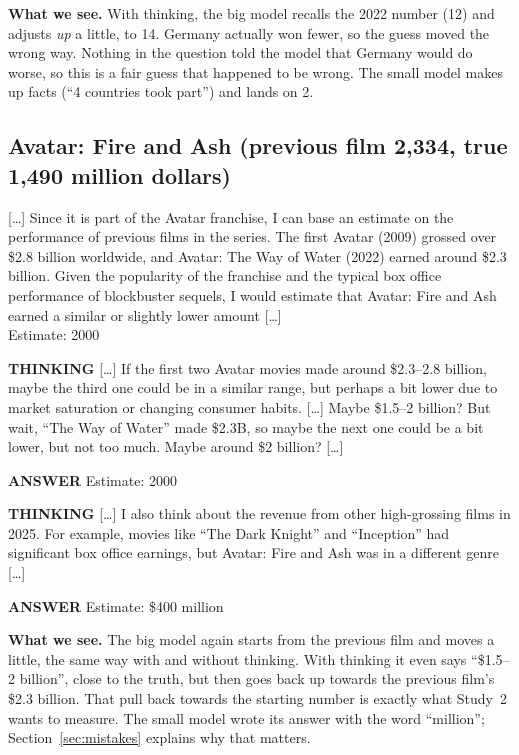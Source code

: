 \documentclass[11pt,a4paper]{article}
\newcommand{\who}[1]{\par\smallskip\noindent\textsf{\textbf{\footnotesize\MakeUppercase{#1}}}\quad}
\newcommand{\cut}{\textup{[\dots]}}
\begin{document}
\noindent\textbf{What we see.} With thinking, the big model recalls the 2022 number (12) and adjusts \emph{up} a little, to 14. Germany actually won fewer, so the guess moved the wrong way. Nothing in the question told the model that Germany would do worse, so this is a fair guess that happened to be wrong. The small model makes up facts (``4 countries took part'') and lands on 2.

\subsection{Avatar: Fire and Ash (previous film 2,334, true 1,490 million dollars)}

\begin{transcript}
\cut{} Since it is part of the Avatar franchise, I can base an estimate on the performance of previous films in the series. The first Avatar (2009) grossed over \$2.8 billion worldwide, and Avatar: The Way of Water (2022) earned around \$2.3 billion. Given the popularity of the franchise and the typical box office performance of blockbuster sequels, I would estimate that Avatar: Fire and Ash earned a similar or slightly lower amount \cut{}\\
Estimate: 2000
\end{transcript}

\begin{transcript}
\who{Thinking} \cut{} If the first two Avatar movies made around \$2.3--2.8 billion, maybe the third one could be in a similar range, but perhaps a bit lower due to market saturation or changing consumer habits. \cut{} Maybe \$1.5--2 billion? But wait, ``The Way of Water'' made \$2.3B, so maybe the next one could be a bit lower, but not too much. Maybe around \$2 billion? \cut{}
\who{Answer} Estimate: 2000
\end{transcript}

\begin{transcript}
\who{Thinking} \cut{} I also think about the revenue from other high-grossing films in 2025. For example, movies like ``The Dark Knight'' and ``Inception'' had significant box office earnings, but Avatar: Fire and Ash was in a different genre \cut{}
\who{Answer} Estimate: \$400 million
\end{transcript}

\noindent\textbf{What we see.} The big model again starts from the previous film and moves a little, the same way with and without thinking. With thinking it even says ``\$1.5--2 billion'', close to the truth, but then goes back up towards the previous film's \$2.3 billion. That pull back towards the starting number is exactly what Study~2 wants to measure. The small model wrote its answer with the word ``million''; Section~\ref{sec:mistakes} explains why that matters.
\end{document}

